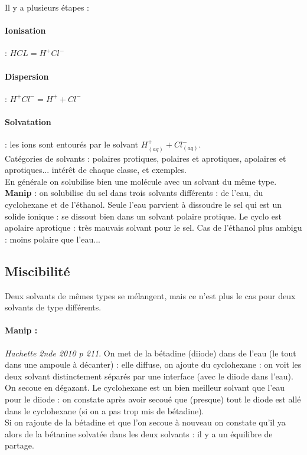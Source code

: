 \documentclass[12pt,prb,aps,epsf]{article}
\begin{document}
Il y a plusieurs étapes :
\paragraph{Ionisation} : $HCL = H^+  Cl^-$
\paragraph{Dispersion} : $H^+Cl^- = H^+ + Cl^-$
\paragraph{Solvatation} : les ions sont entourés par le solvant $H^+_{(aq)} + Cl^-_{(aq)}$.\\

Catégories de solvants : polaires protiques, polaires et aprotiques, apolaires et aprotiques... intérêt de chaque classe, et exemples.\\
En générale on solubilise bien une molécule avec un solvant du même type.\\

\textbf{Manip} : on solubilise du sel dans trois solvants différents : de l'eau, du cyclohexane et de l'éthanol. Seule l'eau parvient à dissoudre le sel qui est un solide ionique : se dissout bien dans un solvant polaire protique. Le cyclo est apolaire aprotique : très mauvais solvant pour le sel. Cas de l'éthanol plus ambigu : moins polaire que l'eau...

\subsection{Miscibilité}
Deux solvants de mêmes types se mélangent, mais ce n'est plus le cas pour deux solvants de type différents.

\paragraph{Manip :} \textit{Hachette 2nde 2010 p 211}. On met de la bétadine (diiode) dans de l'eau (le tout dans une ampoule à décanter) : elle diffuse, on ajoute du cyclohexane : on voit les deux solvant distinctement séparés par une interface (avec le diiode dans l'eau). On secoue en dégazant. Le cyclohexane est un bien meilleur solvant que l'eau pour le diiode : on constate après avoir secoué que (presque) tout le diode est allé dans le cyclohexane (si on a pas trop mis de bétadine).\\

Si on rajoute de la bétadine et que l'on secoue à nouveau on constate qu'il ya alors de la bétanine solvatée dans les deux solvants : il y a un équilibre de partage.
\end{document}
